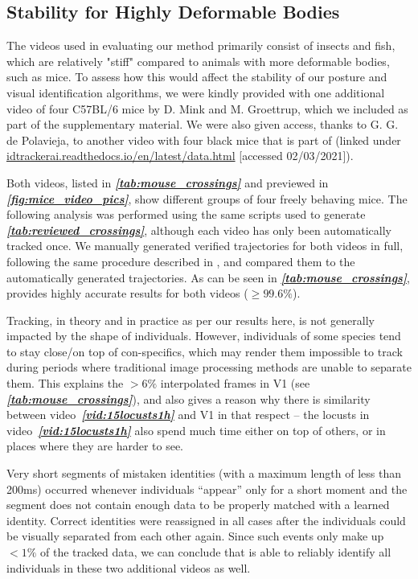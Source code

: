 \documentclass[9pt,lineno]{elife}
\newcommand{\figref}[1]{\textit{\textbf{\ref{#1}}}}
\newcommand{\tableref}[1]{\textit{\textbf{\ref{tab:#1}}}\xspace}
\newcommand{\videoref}[1]{video~\textit{\textbf{\ref{#1}}}}
\newcommand{\TRex}{\protect\path{TRex}}
\begin{document}
\begin{appendixbox}
{\color{blue}
\section{Stability for Highly Deformable Bodies} \label{sec:deformable_bodies}

The videos used in evaluating our method primarily consist of insects and fish, which are relatively "stiff" compared to animals with more deformable bodies, such as mice. To assess how this would affect the stability of our posture and visual identification algorithms, we were kindly provided with one additional video of four C57BL/6 mice by D. Mink and M. Groettrup, which we included as part of the supplementary material. We were also given access, thanks to G. G. de Polavieja, to another video with four black mice that is part of \cite{idtrackerai} (linked under \href{https://idtrackerai.readthedocs.io/en/latest/data.html}{idtrackerai.readthedocs.io/en/latest/data.html} [accessed 02/03/2021]).

Both videos, listed in \tableref{mouse_crossings} and previewed in \figref{fig:mice_video_pics}, show different groups of four freely behaving mice. The following analysis was performed using the same scripts used to generate \tableref{reviewed_crossings}, although each video has only been automatically tracked once. We manually generated verified trajectories for both videos in full, following the same procedure described in , and compared them to the automatically generated trajectories. As can be seen in \tableref{mouse_crossings}, \TRex{} provides highly accurate results for both videos ($\geq 99.6\%$).

Tracking, in theory and in practice as per our results here, is not generally impacted by the shape of individuals. However, individuals of some species tend to stay close/on top of con-specifics, which may render them impossible to track during periods where traditional image processing methods are unable to separate them. This explains the $>6\%$ interpolated frames in V1 (see \tableref{mouse_crossings}), and also gives a reason why there is similarity between \videoref{vid:15locusts1h} and V1 in that respect -- the locusts in \videoref{vid:15locusts1h} also spend much time either on top of others, or in places where they are harder to see.

Very short segments of mistaken identities (with a maximum length of less than 200ms) occurred whenever individuals “appear” only for a short moment and the segment does not contain enough data to be properly matched with a learned identity. Correct identities were reassigned in all cases after the individuals could be visually separated from each other again. Since such events only make up $<1\%$ of the tracked data, we can conclude that \TRex{} is able to reliably identify all individuals in these two additional videos as well.

}
\end{appendixbox}
\end{document}

